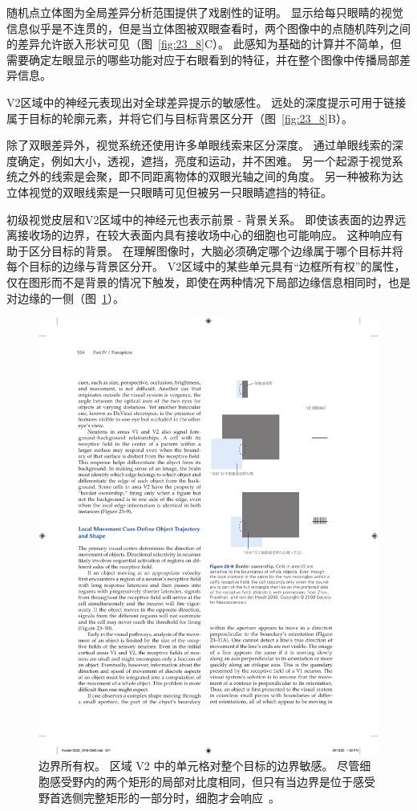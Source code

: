 随机点立体图为全局差异分析范围提供了戏剧性的证明。
显示给每只眼睛的视觉信息似乎是不连贯的，但是当立体图被双眼查看时，两个图像中的点随机阵列之间的差异允许嵌入形状可见（图~\ref{fig:23_8}C）。
此感知为基础的计算并不简单，但需要确定左眼显示的哪些功能对应于右眼看到的特征，并在整个图像中传播局部差异信息。


V2区域中的神经元表现出对全球差异提示的敏感性。 
远处的深度提示可用于链接属于目标的轮廓元素，并将它们与目标背景区分开（图~\ref{fig:23_8}B）。


除了双眼差异外，视觉系统还使用许多单眼线索来区分深度。
通过单眼线索的深度确定，例如大小，透视，遮挡，亮度和运动，并不困难。
另一个起源于视觉系统之外的线索是会聚，即不同距离物体的双眼光轴之间的角度。
另一种被称为达立体视觉的双眼线索是一只眼睛可见但被另一只眼睛遮挡的特征。


初级视觉皮层和V2区域中的神经元也表示前景 - 背景关系。
即使该表面的边界远离接收场的边界，在较大表面内具有接收场中心的细胞也可能响应。
这种响应有助于区分目标的背景。
在理解图像时，大脑必须确定哪个边缘属于哪个目标并将每个目标的边缘与背景区分开。 
V2区域中的某些单元具有“边框所有权”的属性，仅在图形而不是背景的情况下触发，即使在两种情况下局部边缘信息相同时，也是对边缘的一侧（图~\ref{fig:23_9}）。


\begin{figure}[htbp]
	\centering
	\includegraphics[width=0.75\linewidth]{chap23/fig_23_9}
	\caption{边界所有权。
		区域 V2 中的单元格对整个目标的边界敏感。
		尽管细胞感受野内的两个矩形的局部对比度相同，但只有当边界是位于感受野首选侧完整矩形的一部分时，细胞才会响应~\cite{zhou2000coding}。}
	\label{fig:23_9}
\end{figure}




